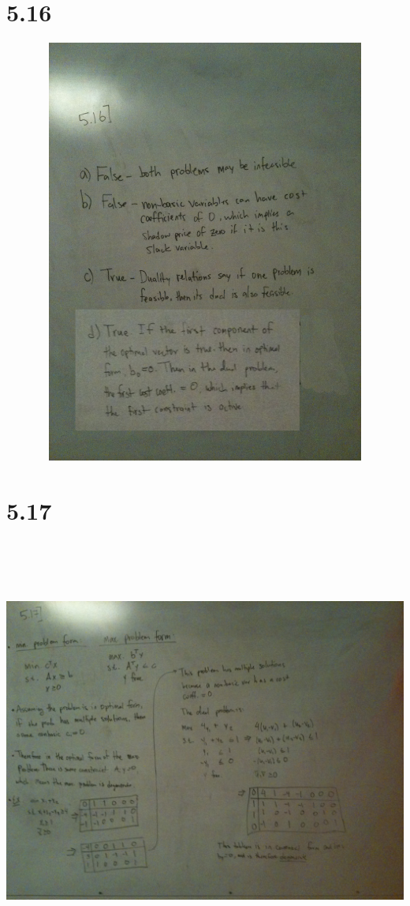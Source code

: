 \documentclass[a4paper,12pt]{article}
\begin{document}
\section*{5.16}
\includegraphics[width=14cm, height=14cm, keepaspectratio=true]{image/fivesixteen.jpg}
\section*{5.17}
\includegraphics[width=14cm, height=14cm, keepaspectratio=true]{image/fiveseventeen.jpg}
\end{document}
